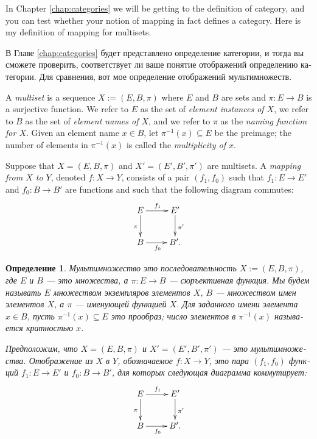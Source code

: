 \documentclass[a4paper]{book}
\def\to{\rightarrow}
\def\taking{\colon}
\def\ss{\subseteq}
\def\m1{{-1}}
\theoremstyle{myth}
\newtheorem{definitionENG}[envENG]{\begin{english}Definition\end{english}}
\newtheorem{definitionRUS}[envRUS]{Определение}
\begin{document}
\begin{russian}
In Chapter \ref{chap:categories} we will be getting to the definition of category, and you can test whether your notion of mapping in fact defines a category. Here is my definition of mapping for multisets.

В Главе \ref{chap:categories} будет представлено определение категории, и тогда вы сможете проверить, соответствует ли ваше понятие отображений определению категории. Для сравнения, вот мое определение отображений мультимножеств.

\begin{definitionENG}\label{def:multiset}
A {\em multiset} is a sequence $X:=(E,B,\pi)$ where $E$ and $B$ are sets and $\pi\taking E\to B$ is a surjective function. We refer to $E$ as the set of {\em element instances of $X$}, we refer to $B$ as the set of {\em element names of $X$}, and we refer to $\pi$ as the {\em naming function for $X$}. Given an element name $x\in B$, let $\pi^\m1(x)\ss E$ be the preimage; the number of elements in $\pi^\m1(x)$ is called the {\em multiplicity of $x$}.

Suppose that $X=(E,B,\pi)$ and $X'=(E',B',\pi')$ are multisets. A {\em mapping from $X$ to $Y$}, denoted $f\taking X\to Y$, consists of a pair $(f_1,f_0)$ such that $f_1\taking E\to E'$ and $f_0\taking B\to B'$ are functions and such that the following diagram commutes:
\begin{align}\label{dia:multiset map}
\xymatrix{E\ar[r]^{f_1}\ar[d]_{\pi}&E'\ar[d]^{\pi'}\\B\ar[r]_{f_0}&B'.}
\end{align}
\end{definitionENG}

\begin{definitionRUS}\label{def:multiset}
{\em Мультимножество} это последовательность $X:=(E,B,\pi)$, где $E$ и $B$ — это множества, а $\pi\taking E\to B$ — сюръективная функция. Мы будем называть $E$ множеством {\em экземпляров элементов $X$}, $B$ — множеством {\em имен элементов $X$}, а $\pi$ — {\em именующей функцией $X$}. Для заданного имени элемента $x\in B$, пусть $\pi^\m1(x)\ss E$ это прообраз; число элементов в $\pi^\m1(x)$ называется {\em кратностью $x$}.

Предположим, что $X=(E,B,\pi)$ и $X'=(E',B',\pi')$ — это мультимножества. {\em Отображение из $X$ в $Y$}, обозначаемое $f\taking X\to Y$, это пара $(f_1,f_0)$ функций $f_1\taking E\to E'$ и $f_0\taking B\to B'$, для которых следующая диаграмма коммутирует:
\begin{align}\label{dia:multiset map}
\xymatrix{E\ar[r]^{f_1}\ar[d]_{\pi}&E'\ar[d]^{\pi'}\\B\ar[r]_{f_0}&B'.}
\end{align}
\end{definitionRUS}


\end{russian}
\end{document}

